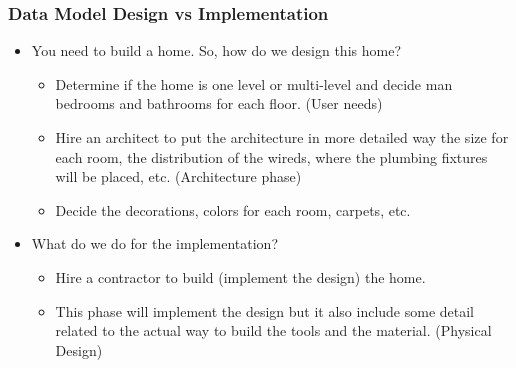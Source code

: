 \begin{frame}
    \frametitle{Data Model Design vs Implementation}
    \begin{itemize}[<+->]
        \item You need to build a home. So, how do we design this home?
        \begin{itemize}[<+->]
            \item Determine if the home is one level or multi-level and decide man bedrooms and bathrooms for each floor. (User needs)
            \item Hire an architect to put the architecture in more detailed way \faEdit \space \faArrowCircleORight \space the size for each room, the distribution of the wireds, where the plumbing fixtures will be placed, etc. (Architecture phase)
            \item Decide the decorations, colors for each room, carpets, etc.
        \end{itemize}
        \item What do we do for the implementation?
        \begin{itemize}[<+->]
            \item Hire a contractor to build (implement the design) the home.
            \item This phase will implement the design but it also include some detail related to the actual way to build the tools and the material. (Physical Design)
        \end{itemize}
    \end{itemize}
\end{frame}

